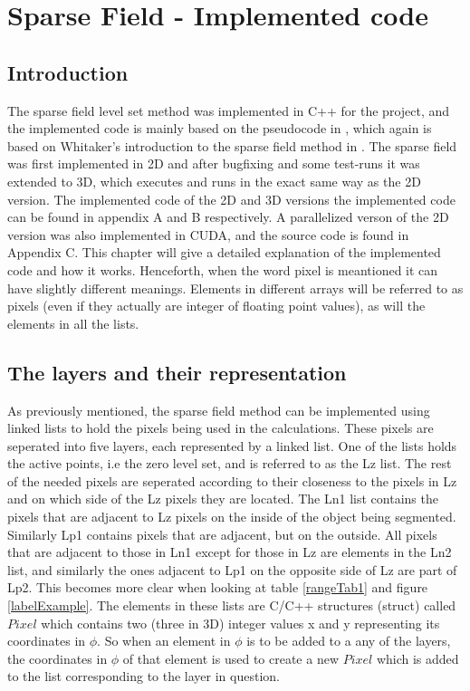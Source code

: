 \chapter{Sparse Field - Implemented code}
\section{Introduction}
The sparse field level set method was implemented in C++ for the project, and the implemented code is mainly based on the pseudocode in \cite{lankton09}, which again is based on Whitaker's introduction to the sparse field method in \cite{whitaker89}. 
The sparse field was first implemented in 2D and after bugfixing and some test-runs it was extended to 3D, which executes and runs in the exact same way as the 2D version. The implemented code of the 2D and 3D versions the implemented code can be found in appendix A and B respectively. A parallelized verson of the 2D version was also implemented in CUDA, and the source code is found in Appendix C. This chapter will give a detailed explanation of the implemented code and how it works. Henceforth, when the word pixel is meantioned it can have slightly different meanings. Elements in different arrays will be referred to as pixels (even if they actually are integer of floating point values), as will the elements in all the lists. 

\section{The layers and their representation}
As previously mentioned, the sparse field method can be implemented using linked lists to hold the pixels being used in the calculations. These pixels are seperated into five layers, each represented by a linked list. One of the lists holds the active points, i.e the zero level set, and is referred to as the Lz list. The rest of the needed pixels are seperated according to their closeness to the pixels in Lz and on which side of the Lz pixels they are located. The Ln1 list contains the pixels that are adjacent to Lz pixels on the inside of the object being segmented. Similarly Lp1 contains pixels that are adjacent, but on the outside. All pixels that are adjacent to those in Ln1 except for those in Lz are elements in the Ln2 list, and similarly the ones adjacent to Lp1 on the opposite side of Lz are part of Lp2. This becomes more clear when looking at table \ref{rangeTab1} and figure \ref{labelExample}. The elements in these lists are C/C++ structures (struct) called $Pixel$ which contains two (three in 3D) integer values x and y representing its coordinates in $\phi$. So when an element in $\phi$ is to be added to a any of the layers, the coordinates in $\phi$ of that element is used to create a new $Pixel$ which is added to the list corresponding to the layer in question. 

